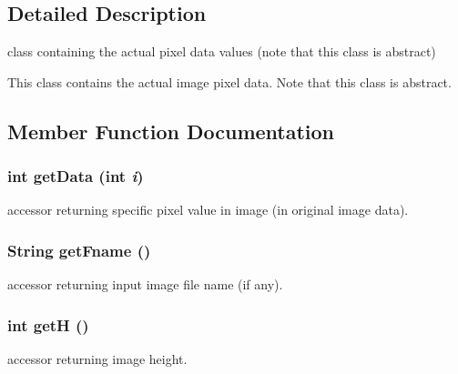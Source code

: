 \subsection{Detailed Description}
class containing the actual pixel data values (note that this class is abstract) 

This class contains the actual image pixel data. Note that this class is abstract. 



\subsection{Member Function Documentation}
\subsubsection{\setlength{\rightskip}{0pt plus 5cm}int get\-Data (int {\em i})}\label{class_c_s_image_viewer_1_1_image_data_484a091210aca6efdb70b5fa2083f978}


accessor returning specific pixel value in image (in original image data). 

\subsubsection{\setlength{\rightskip}{0pt plus 5cm}String get\-Fname ()}\label{class_c_s_image_viewer_1_1_image_data_c4573ecf419c7e5ee6940d80198ca053}


accessor returning input image file name (if any). 

\subsubsection{\setlength{\rightskip}{0pt plus 5cm}int get\-H ()}\label{class_c_s_image_viewer_1_1_image_data_9921a0a54c2b0b3948d1b914e88bd1d8}


accessor returning image height. 

